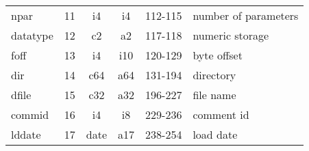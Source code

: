 \begin{center}
\begin{tabular*}{1.0\textwidth}{@{\extracolsep{\fill}}|lccccl|}
npar    &11  &   i4   &  i4    &  112-115 & number of parameters \\
datatype&12  &   c2   &  a2    &  117-118 & numeric storage \\
foff    &13  &   i4   &  i10   &  120-129 & byte offset \\
dir     &14  &   c64  &  a64   &  131-194 & directory \\
dfile   &15  &   c32  &  a32   &  196-227 & file name \\
commid  &16  &   i4   &  i8    &  229-236 & comment id \\
lddate  &17  &  date  &  a17   &  238-254 & load date \\ \cline{1-6}
\end{tabular*}
\end{center}

\newpage

 
